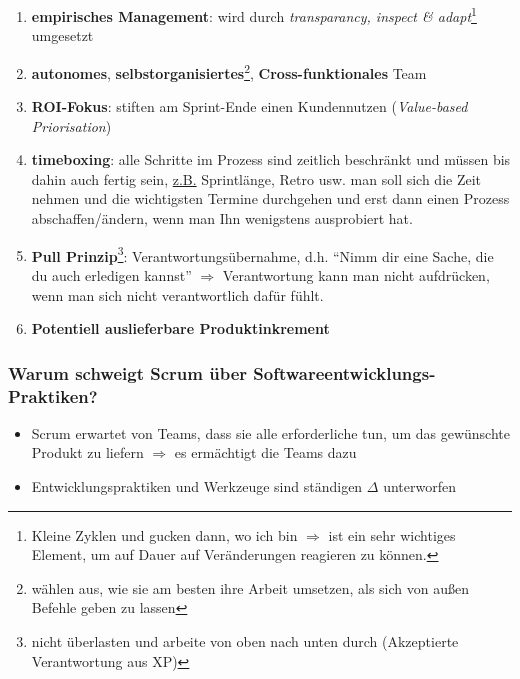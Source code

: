 

\begin{enumerate}
  \item \textbf{empirisches Management}: wird durch \textit{transparancy, inspect \&
      adapt}\footnote{Kleine Zyklen und gucken dann, wo ich bin $\Rightarrow$ ist ein sehr wichtiges
    Element, um auf Dauer auf Veränderungen reagieren zu können.} umgesetzt
\item \textbf{autonomes}, \textbf{selbstorganisiertes}\footnote{wählen aus, wie sie am besten ihre Arbeit umsetzen,
    als sich von außen Befehle geben zu lassen}, \textbf{Cross-funktionales} Team
  \item \textbf{ROI-Fokus}: stiften am Sprint-Ende einen Kundennutzen (\textit{Value-based Priorisation})
  \item \textbf{timeboxing}: alle Schritte im Prozess sind zeitlich beschränkt und müssen bis dahin
    auch fertig sein, \uline{z.B.}
    Sprintlänge, Retro usw. man soll sich die Zeit nehmen und die wichtigsten Termine
    durchgehen und erst dann einen Prozess abschaffen/ändern, wenn man Ihn wenigstens
    ausprobiert hat.
  \item \textbf{Pull Prinzip}\footnote{nicht überlasten und arbeite von oben nach unten durch
      (Akzeptierte Verantwortung aus XP)}: Verantwortungsübernahme, d.h. \enquote{Nimm dir eine Sache, die du
      auch erledigen kannst} $\Rightarrow$ Verantwortung kann man nicht aufdrücken, wenn man sich nicht verantwortlich dafür fühlt.
  \item \textbf{Potentiell auslieferbare Produktinkrement}
\end{enumerate}


\subsubsection{Warum schweigt Scrum über Softwareentwicklungs-Praktiken?}
\begin{itemize}
  \item Scrum erwartet von Teams, dass sie alle erforderliche tun, um das gewünschte Produkt zu
    liefern $\Rightarrow$ es ermächtigt die Teams dazu
  \item Entwicklungspraktiken und Werkzeuge sind ständigen $\Delta$ unterworfen
\end{itemize}


